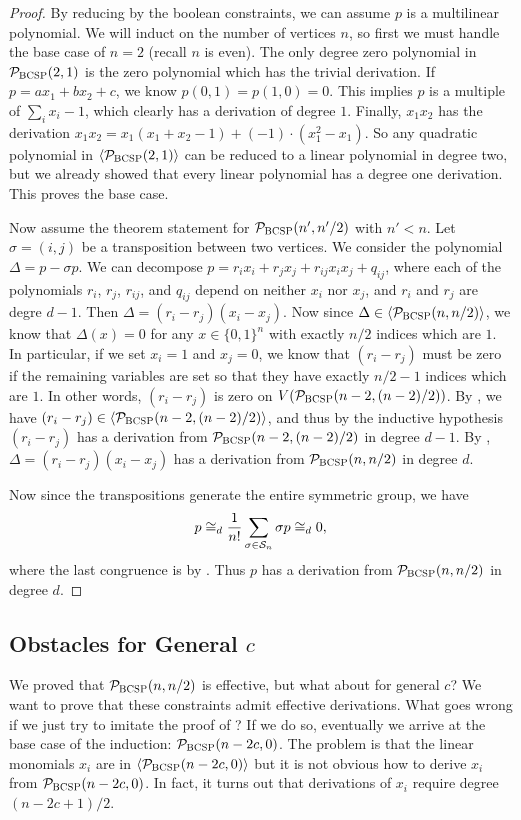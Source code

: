 \begin{proof}
By reducing by the boolean constraints, we can assume $p$ is a multilinear polynomial. 
We will induct on the number of vertices $n$, so first we must handle the base case of $n = 2$ (recall $n$ is even). 
The only degree zero polynomial in $\mathcal P_{\textsc{BCSP}}(2,1)$ is the zero polynomial which has the trivial derivation. 
If $p = ax_1 + bx_2 + c$, we know $p(0,1) = p(1,0) = 0$. This implies $p$ is a multiple of $\sum_i x_i - 1$, which clearly has a derivation of degree $1$.
Finally, $x_1x_2$ has the derivation $x_1x_2 = x_1(x_1+x_2-1) + (-1)\cdot(x_1^2 - x_1)$. So any quadratic polynomial in $\langle \mathcal P_{\textsc{BCSP}}(2,1) \rangle$ can be reduced to a linear polynomial in degree two, but we already showed that every linear polynomial has a degree one derivation. This proves the base case. 

Now assume the theorem statement for $\mathcal P_{\textsc{BCSP}}(n',n'/2)$ with $n' < n$. 
Let $\sigma = (i,j)$ be a transposition between two vertices. 
We consider the polynomial $\Delta = p - \sigma p$. 
We can decompose $p = r_i x_i + r_j x_j + r_{ij} x_ix_j + q_{ij}$, where each of the polynomials $r_i$, $r_j$, $r_{ij}$, and $q_{ij}$ depend on neither $x_i$ nor $x_j$, and $r_i$ and $r_j$ are degre $d-1$. Then $\Delta = (r_i - r_j)(x_i - x_j)$. Now since $\Delta \in \langle \mathcal P_{\textsc{BCSP}}(n,n/2) \rangle$, we know that $\Delta(x) = 0$ for any $x \in \{0,1\}^n$ with exactly $n/2$ indices which are $1$. In particular, if we set $x_i = 1$ and $x_j = 0$, we know that $(r_i - r_j)$ must be zero if the remaining variables are set so that they have exactly $n/2 - 1$ indices which are $1$. In other words, $(r_i - r_j)$ is zero on $V(\mathcal P_{\textsc{BCSP}}(n-2,(n-2)/2))$. By , we have $(r_i - r_j) \in \langle \mathcal P_{\textsc{BCSP}}(n-2,(n-2)/2) \rangle$, and thus by the inductive hypothesis $(r_i - r_j)$ has a derivation from $\mathcal P_{\textsc{BCSP}}(n-2,(n-2)/2)$ in degree $d-1$. By , $\Delta = (r_i - r_j)(x_i - x_j)$ has a derivation from $\mathcal P_{\textsc{BCSP}}(n,n/2)$ in degree $d$. 

Now since the transpositions generate the entire symmetric group, we have 
\[p \cong_d \frac{1}{n!} \sum_{\sigma \in \mathcal S_n} \sigma p \cong_d 0,\] 
where the last congruence is by . Thus $p$ has a derivation from $\mathcal P_{\textsc{BCSP}}(n,n/2)$ in degree $d$. 
\end{proof}

\subsection{Obstacles for General $c$}
We proved that $\mathcal P_{\textsc{BCSP}}(n,n/2)$ is effective, but what about for general $c$?
We want to prove that these constraints admit effective derivations.
What goes wrong if we just try to imitate the proof of ?
If we do so, eventually we arrive at the base case of the induction: $\mathcal P_{\textsc{BCSP}}(n-2c,0)$.
The problem is that the linear monomials $x_i$ are in $\langle \mathcal P_{\textsc{BCSP}}(n-2c,0) \rangle$ but it is not obvious how to derive $x_i$ from $\mathcal P_{\textsc{BCSP}}(n-2c,0)$. 
In fact, it turns out that derivations of $x_i$ require degree $(n-2c+1)/2$. 

